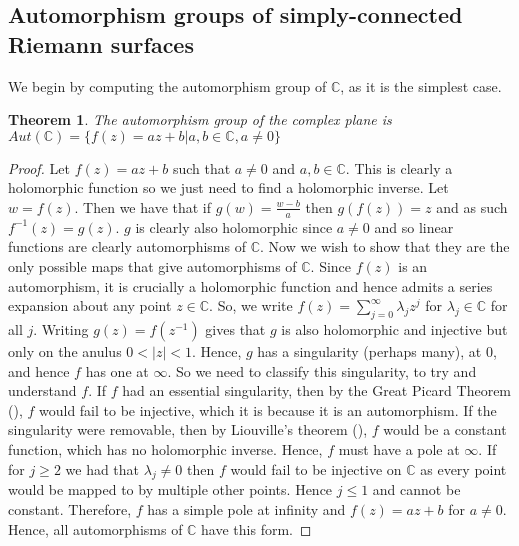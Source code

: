\documentclass[11pt]{report}
\newtheorem{thm}{Theorem}[section]
\theoremstyle{definition}
\begin{document}
\subsection{Automorphism groups of simply-connected Riemann surfaces}
We begin by computing the automorphism group of $\mathbb{C}$, as it is the simplest case.
\begin{thm}\label{Aut(C)} 
  The automorphism group of the complex plane is ~\\$Aut(\mathbb{C})=\{f(z)=az+b \vert a, b \in  \mathbb{C}, a \neq 0\}$
\end{thm}
\begin{proof}
  Let $f(z) = az+b$ such that $a\neq 0$ and $a,b \in \mathbb{C}$. This is clearly a holomorphic function so we just need to find a holomorphic inverse. Let $w = f(z)$. Then we have that if $g(w) = \frac{w - b}{a}$ then $g(f(z))=z$ and as such $f^{-1}(z)=g(z)$. $g$ is clearly also holomorphic since $a \neq 0$ and so linear functions are clearly automorphisms of $\mathbb{C}$. Now we wish to show that they are the only possible maps that give automorphisms of $\mathbb{C}$. \newline
  Since $f(z)$ is an automorphism, it is crucially a holomorphic function and hence admits a series expansion about any point $z \in \mathbb{C}$. So, we write $f(z) = \sum\limits_{j=0}^{\infty}\lambda_jz^j$ for $\lambda_j \in \mathbb{C}$ for all $j$. Writing $g(z)=f(z^{-1})$ gives that $g$ is also holomorphic and injective but only on the anulus $0 < |z| < 1$. Hence, $g$ has a singularity (perhaps many), at $0$, and hence $f$ has one at $\infty$. So we need to classify this singularity, to try and understand $f$. If $f$ had an essential singularity, then by the Great Picard Theorem (\cite[p.300]{conway}), $f$ would fail to be injective, which it is because it is an automorphism. If the singularity were removable, then by Liouville's theorem (\cite[p.122]{ahlfors}), $f$ would be a constant function, which has no holomorphic inverse. Hence, $f$ must have a pole at $\infty$. If for $j\geq 2$ we had that $\lambda_j \neq 0$ then $f$ would fail to be injective on $\mathbb{C}$ as every point would be mapped to by multiple other points. Hence $j \leq 1$ and cannot be constant. Therefore, $f$ has a simple pole at infinity and $f(z) = az + b$ for $a \neq 0$. Hence, all automorphisms of $\mathbb{C}$ have this form.
\end{proof}
\end{document}
